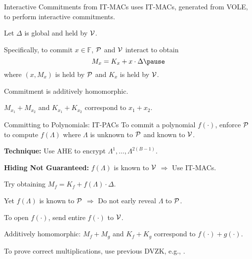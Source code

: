 \begin{frame}{Interactive Commitments from IT-MACs}
	\cite{BaumMRS21, YangSWW21, DittmerIO21} uses IT-MACs, generated from VOLE, to perform interactive commitments. \pause
	
	Let  $\Delta$ is global and held by $\mathcal{V}$.\pause
	
	Specifically, to commit $x \in \mathbb{F}$,  $\mathcal{P}$ and $\mathcal{V}$ interact to obtain\pause
	\begin{equation*}
		M_x = K_x + x\cdot \Delta\pause
	\end{equation*}
	where $(x, M_x)$ is held by $\mathcal{P}$ and $K_x$ is held by $\mathcal{V}$.
	
	Commitment is additively homomorphic. \pause
	
	$M_{x_1} + M_{x_2}$ and $K_{x_1} + K_{x_2}$ correspond to $x_1 + x_2$.
\end{frame}
\begin{frame}{Committing to Polynomials: IT-PACs}
	To commit a polynomial $f(\cdot)$, enforce $\mathcal{P}$ to compute $f(\Lambda)$ where $\Lambda$ is unknown to $\mathcal{P}$ and known to $\mathcal{V}$.\pause
	
	\textbf{Technique:} Use AHE to encrypt $\Lambda^1, \dots, \Lambda^{2(B - 1)}$.\pause
	
	\textbf{Hiding Not Guaranteed:} $f(\Lambda)$ is known to $\mathcal{V}$ $\Rightarrow$ Use IT-MACs.\pause
	
	Try obtaining $M_f = K_f + f(\Lambda) \cdot \Delta$.\pause
	
	Yet $f(\Lambda)$ is known to $\mathcal{P}$ $\Rightarrow$ Do not early reveal $\Lambda$ to $\mathcal{P}$.\pause
	
	To open $f(\cdot)$, send entire $f(\cdot)$ to $\mathcal{V}$.\pause
	
	Additively homomorphic: $M_{f} + M_{g}$ and $K_{f} + K_{g}$ correspond to $f(\cdot) + g(\cdot)$.\pause
	
	To prove correct multiplications, use previous DVZK, e.g., \cite{YangSWW21}.
\end{frame}